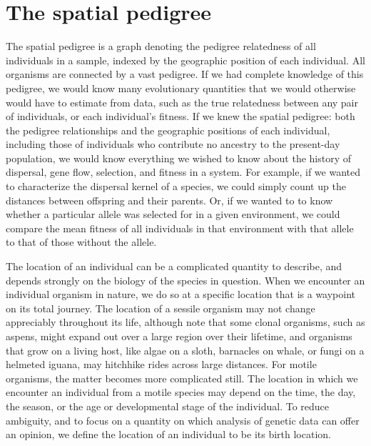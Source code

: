 \documentclass{ar-1col}
\newcommand{\todo}[1]{{\textbf{\color{red}{#1}}}}
\begin{document}
\section{The spatial pedigree}

\todo{read through and edit}

The spatial pedigree is
a graph denoting the pedigree relatedness of all individuals in a sample,
indexed by the geographic position of each individual.
All organisms are connected by a vast pedigree.
If we had complete knowledge of this pedigree,
we would know many evolutionary quantities
that we would otherwise would have to estimate from data,
such as the true relatedness between any pair of individuals,
or each individual's fitness.
If we knew the spatial pedigree:
both the pedigree relationships
and the geographic positions of each individual,
including those of individuals
who contribute no ancestry to the present-day population,
we would know everything we wished to know about
the history of dispersal, gene flow,
selection, and fitness in a system.
For example, if we wanted to characterize the dispersal kernel of a species,
we could simply count up the distances between offspring and their parents.
Or, if we wanted to to know whether a particular allele
was selected for in a given environment,
we could compare the mean fitness of all individuals in that environment with that allele
to that of those without the allele.

The location of an individual can be a complicated quantity to describe,
and depends strongly on the biology of the species in question.
When we encounter an individual organism in nature,
we do so at a specific location
that is a waypoint on its total journey.
The location of a sessile organism
may not change appreciably throughout its life,
although note that some clonal organisms,
such as aspens,
might expand out over a large region over their lifetime,
and organisms that grow on a living host,
like algae on a sloth,
barnacles on whale,
or fungi on a helmeted iguana,
may hitchhike rides across large distances.
For motile organisms,
the matter becomes more complicated still.
The location in which we encounter an individual
from a motile species may depend
on the time, the day, the season,
or the age or developmental stage of the individual.
To reduce ambiguity,
and to focus on a quantity
on which analysis of genetic data can offer an opinion,
we define the location of an individual to be its birth location.
\end{document}
